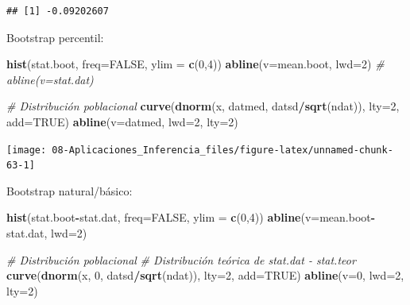 \documentclass[]{book}
\newenvironment{Shaded}{\begin{snugshade}}{\end{snugshade}}
\newcommand{\KeywordTok}[1]{\textcolor[rgb]{0.13,0.29,0.53}{\textbf{#1}}}
\newcommand{\DataTypeTok}[1]{\textcolor[rgb]{0.13,0.29,0.53}{#1}}
\newcommand{\DecValTok}[1]{\textcolor[rgb]{0.00,0.00,0.81}{#1}}
\newcommand{\CommentTok}[1]{\textcolor[rgb]{0.56,0.35,0.01}{\textit{#1}}}
\newcommand{\OtherTok}[1]{\textcolor[rgb]{0.56,0.35,0.01}{#1}}
\newcommand{\OperatorTok}[1]{\textcolor[rgb]{0.81,0.36,0.00}{\textbf{#1}}}
\newcommand{\NormalTok}[1]{#1}
\theoremstyle{definition}
\theoremstyle{definition}
\theoremstyle{definition}
\theoremstyle{remark}
\begin{document}
\begin{verbatim}
## [1] -0.09202607
\end{verbatim}

Bootstrap percentil:

\begin{Shaded}
\begin{Highlighting}[]
\KeywordTok{hist}\NormalTok{(stat.boot, }\DataTypeTok{freq=}\OtherTok{FALSE}\NormalTok{, }\DataTypeTok{ylim =} \KeywordTok{c}\NormalTok{(}\DecValTok{0}\NormalTok{,}\DecValTok{4}\NormalTok{))}
\KeywordTok{abline}\NormalTok{(}\DataTypeTok{v=}\NormalTok{mean.boot, }\DataTypeTok{lwd=}\DecValTok{2}\NormalTok{)}
\CommentTok{# abline(v=stat.dat)}

\CommentTok{# Distribución poblacional}
\KeywordTok{curve}\NormalTok{(}\KeywordTok{dnorm}\NormalTok{(x, datmed, datsd}\OperatorTok{/}\KeywordTok{sqrt}\NormalTok{(ndat)), }\DataTypeTok{lty=}\DecValTok{2}\NormalTok{, }\DataTypeTok{add=}\OtherTok{TRUE}\NormalTok{)}
\KeywordTok{abline}\NormalTok{(}\DataTypeTok{v=}\NormalTok{datmed, }\DataTypeTok{lwd=}\DecValTok{2}\NormalTok{, }\DataTypeTok{lty=}\DecValTok{2}\NormalTok{)}
\end{Highlighting}
\end{Shaded}

\begin{center}\texttt{[image: 08-Aplicaciones\_Inferencia\_files/figure-latex/unnamed-chunk-63-1]} \end{center}

Bootstrap natural/básico:

\begin{Shaded}
\begin{Highlighting}[]
\KeywordTok{hist}\NormalTok{(stat.boot}\OperatorTok{-}\NormalTok{stat.dat, }\DataTypeTok{freq=}\OtherTok{FALSE}\NormalTok{, }\DataTypeTok{ylim =} \KeywordTok{c}\NormalTok{(}\DecValTok{0}\NormalTok{,}\DecValTok{4}\NormalTok{))}
\KeywordTok{abline}\NormalTok{(}\DataTypeTok{v=}\NormalTok{mean.boot}\OperatorTok{-}\NormalTok{stat.dat, }\DataTypeTok{lwd=}\DecValTok{2}\NormalTok{)}

\CommentTok{# Distribución poblacional}
\CommentTok{# Distribución teórica de stat.dat - stat.teor}
\KeywordTok{curve}\NormalTok{(}\KeywordTok{dnorm}\NormalTok{(x, }\DecValTok{0}\NormalTok{, datsd}\OperatorTok{/}\KeywordTok{sqrt}\NormalTok{(ndat)), }\DataTypeTok{lty=}\DecValTok{2}\NormalTok{, }\DataTypeTok{add=}\OtherTok{TRUE}\NormalTok{)   }
\KeywordTok{abline}\NormalTok{(}\DataTypeTok{v=}\DecValTok{0}\NormalTok{, }\DataTypeTok{lwd=}\DecValTok{2}\NormalTok{, }\DataTypeTok{lty=}\DecValTok{2}\NormalTok{)}
\end{Highlighting}
\end{Shaded}
\end{document}
